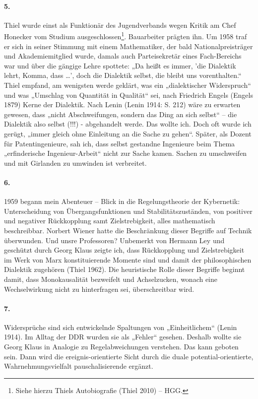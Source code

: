 \documentclass[a4paper,11pt]{article}
\begin{document}
\paragraph{5.}
Thiel wurde einst als Funktionär des Jugendverbands wegen Kritik am Chef
Honecker vom Studium ausgeschlossen\footnote{Siehe hierzu Thiels Autobiografie
  (Thiel 2010) -- HGG.}. Bauarbeiter prägten ihn. Um 1958 traf er sich in
seiner Stimmung mit einem Mathematiker, der bald Nationalpreisträger und
Akademiemitglied wurde, damals auch Parteisekretär eines Fach-Bereichs war und
über die gängige Lehre spottete: „Da heißt es immer, 'die Dialektik lehrt,
Komma, dass \ldots', doch die Dialektik selbst, die bleibt uns vorenthalten.“
Thiel empfand, am wenigsten werde geklärt, was ein „dialektischer Widerspruch“
und was „Umschlag von Quantität in Qualität“ sei, nach Friedrich Engels
(Engels 1879) Kerne der Dialektik. Nach Lenin (Lenin 1914: S. 212) wäre zu
erwarten gewesen, dass „nicht Abschweifungen, sondern das Ding an sich selbst“
– die Dialektik also selbst (!!!) - abgehandelt werde. Das wollte ich. Doch
oft wurde ich gerügt, „immer gleich ohne Einleitung an die Sache zu gehen“.
Später, als Dozent für Patentingenieure, sah ich, dass selbst gestandne
Ingenieure beim Thema „erfinderische Ingenieur-Arbeit“ nicht zur Sache kamen.
Sachen zu umschweifen und mit Girlanden zu umwinden ist verbreitet.

\paragraph{6.}
1959 begann mein Abenteuer -- Blick in die Regelungstheorie der Kybernetik:
Unterscheidung von Übergangsfunktionen und Stabilitätszuständen, von positiver
und negativer Rückkopplung samt Zielstrebigkeit, alles mathematisch
beschreibbar.  Norbert Wiener hatte die Beschränkung dieser Begriffe auf
Technik überwunden. Und unsre Professoren? Unbemerkt von Hermann Ley und
geschützt durch Georg Klaus zeigte ich, dass Rückkopplung und Zielstrebigkeit
im Werk von Marx konstituierende Momente sind und damit der philosophischen
Dialektik zugehören (Thiel 1962). Die heuristische Rolle dieser Begriffe
beginnt damit, dass Monokausalität bezweifelt und Achselzucken, wonach eine
Wechselwirkung nicht zu hinterfragen sei, überschreitbar wird.

\paragraph{7.}
Widersprüche sind sich entwickelnde Spaltungen von „Einheitlichem“ (Lenin
1914).  Im Alltag der DDR wurden sie als „Fehler“ gesehen. Deshalb wollte sie
Georg Klaus in Analogie zu Regelabweichungen verstehen. Das kann geboten sein.
Dann wird die ereignis-orientierte Sicht durch die duale
potential-orientierte, Wahrnehmungsvielfalt pauschalisierende ergänzt.
\end{document}
